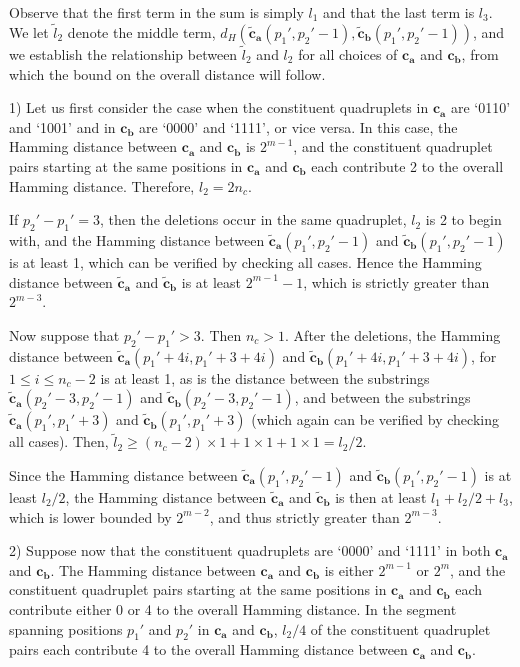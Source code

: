 Observe that the first term in the sum is simply $l_1$ and that
the last term is $l_3$. We let $\tilde{l}_2$ denote the middle
term,
$d_H\left(\mathbf{\tilde{c}_a}(p_1',p_2'-1),\mathbf{\tilde{c}_b}(p_1',p_2'-1)\right)$,
and we establish the relationship between $\tilde{l}_2$ and $l_2$
for all choices of $\mathbf{c_a}$ and $\mathbf{c_b}$, from which
the bound on the overall distance will follow.

1) Let us first consider the case when the constituent quadruplets
in $\mathbf{c_a}$ are `0110' and `1001' and in $\mathbf{c_b}$ are
`0000' and `1111', or vice versa. In this case, the Hamming
distance between $\mathbf{c_a}$ and $\mathbf{c_b}$ is $2^{m-1}$,
and the constituent quadruplet pairs starting at the same
positions in $\mathbf{c_a}$ and $\mathbf{c_b}$ each contribute 2
to the overall Hamming distance. Therefore, $l_2=2n_c$.

If $p_2'-p_1'=3$, then the deletions occur in the same quadruplet,
$l_2$ is 2 to begin with, and the Hamming distance between
$\mathbf{\tilde{c}_a}(p_1',p_2'-1)$ and
$\mathbf{\tilde{c}_b}(p_1',p_2'-1)$ is at least 1, which can be
verified by checking all cases. Hence the Hamming distance between
$\mathbf{\tilde{c}_a}$ and $\mathbf{\tilde{c}_b}$ is at least
$2^{m-1} -1$, which is strictly greater than $2^{m-3}$.

Now suppose that $p_2'-p_1'>3$. Then $n_c>1$. After the deletions,
the Hamming distance between
$\mathbf{\tilde{c}_a}(p_1'+4i,p_1'+3+4i)$ and
$\mathbf{\tilde{c}_b}(p_1'+4i,p_1'+3+4i)$, for $1 \leq i \leq
n_c-2$ is at least 1, as is the distance between the substrings
$\mathbf{\tilde{c}_a}(p_2'-3,p_2'-1)$ and
$\mathbf{\tilde{c}_b}(p_2'-3,p_2'-1)$, and between the substrings
$\mathbf{\tilde{c}_a}(p_1',p_1'+3)$ and
$\mathbf{\tilde{c}_b}(p_1',p_1'+3)$ (which again can be verified
by checking all cases). Then, $\tilde{l}_2 \geq (n_c-2)\times 1 +
1\times 1 +1\times 1=l_2/2$.

Since the Hamming distance between
$\mathbf{\tilde{c}_a}(p_1',p_2'-1)$ and
$\mathbf{\tilde{c}_b}(p_1',p_2'-1)$ is at least $l_2/2$, the
Hamming distance between $\mathbf{\tilde{c}_a}$ and
$\mathbf{\tilde{c}_b}$ is then at least $l_1+l_2/2+l_3$, which is
lower bounded by $2^{m-2}$, and thus strictly greater than
$2^{m-3}$.


2) Suppose now that the constituent quadruplets are `0000' and
`1111' in both $\mathbf{c_a}$ and $\mathbf{c_b}$. The Hamming
distance between $\mathbf{c_a}$ and $\mathbf{c_b}$ is either
$2^{m-1}$ or $2^m$, and the constituent quadruplet pairs starting
at the same positions in $\mathbf{c_a}$ and $\mathbf{c_b}$ each
contribute either 0 or 4 to the overall Hamming distance. In the
segment spanning positions $p_1'$ and $p_2'$ in $\mathbf{c_a}$ and
$\mathbf{c_b}$, $l_2/4$ of the constituent quadruplet pairs each
contribute 4 to the overall Hamming distance between
$\mathbf{c_a}$ and $\mathbf{c_b}$.

